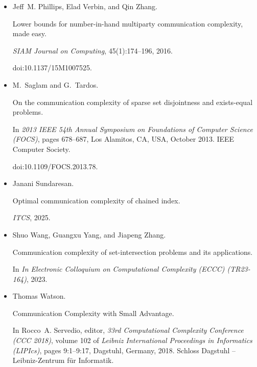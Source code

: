 \documentclass[10pt,a4paper]{article}
\begin{document}
\begin{itemize}
\item[] 
[41]

Jeff M. Phillips, Elad Verbin, and Qin Zhang.


Lower bounds for number-in-hand multiparty communication complexity,
made easy.


\emph{SIAM Journal on Computing}, 45(1):174–196, 2016.


doi:10.1137/15M1007525.





\item[] 
[42]

M. Saglam and G. Tardos.


On the communication complexity of sparse set disjointness and
exists-equal problems.


In \emph{2013 IEEE 54th Annual Symposium on Foundations of Computer
Science (FOCS)}, pages 678–687, Los Alamitos, CA, USA, October 2013. IEEE
Computer Society.


doi:10.1109/FOCS.2013.78.





\item[] 
[43]

Janani Sundaresan.


Optimal communication complexity of chained index.


\emph{ITCS}, 2025.





\item[] 
[44]

Shuo Wang, Guangxu Yang, and Jiapeng Zhang.


Communication complexity of set-intersection problems and its
applications.


In \emph{In Electronic Colloquium on Computational Complexity (ECCC)
(TR23-164)}, 2023.





\item[] 
[45]

Thomas Watson.


Communication Complexity with Small Advantage.


In Rocco A. Servedio, editor, \emph{33rd Computational Complexity
Conference (CCC 2018)}, volume 102 of \emph{Leibniz International Proceedings
in Informatics (LIPIcs)}, pages 9:1–9:17, Dagstuhl, Germany, 2018. Schloss
Dagstuhl – Leibniz-Zentrum für Informatik.



\end{itemize}
\end{document}
